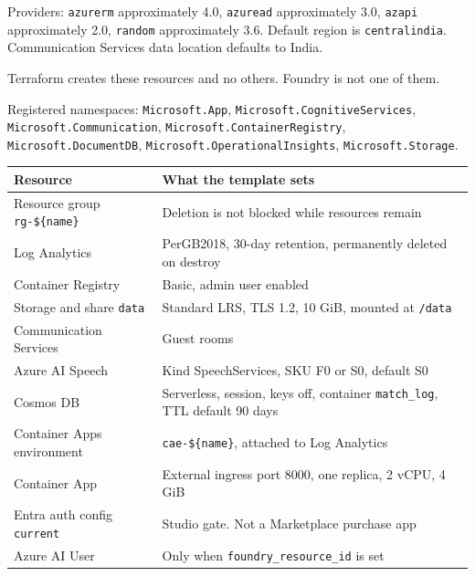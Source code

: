 \documentclass[11pt]{article}
\begin{document}
Providers: \texttt{azurerm} approximately 4.0, \texttt{azuread} approximately 3.0,
\texttt{azapi} approximately 2.0, \texttt{random} approximately 3.6.
Default region is \texttt{centralindia}.
Communication Services data location defaults to India.

\begin{center}
\end{center}
{\small\color{Muted} Terraform creates these resources and no others. Foundry is not one of them.\par}
Registered namespaces: \texttt{Microsoft.App}, \texttt{Microsoft.CognitiveServices},
\texttt{Microsoft.Communication}, \texttt{Microsoft.ContainerRegistry},
\texttt{Microsoft.DocumentDB}, \texttt{Microsoft.OperationalInsights},
\texttt{Microsoft.Storage}.

\begin{tabularx}{\textwidth}{@{}lX@{}}
\toprule
Resource & What the template sets \\
\midrule
Resource group \texttt{rg-\$\{name\}} & Deletion is not blocked while resources remain \\
Log Analytics & PerGB2018, 30-day retention, permanently deleted on destroy \\
Container Registry & Basic, admin user enabled \\
Storage and share \texttt{data} & Standard LRS, TLS 1.2, 10 GiB, mounted at \texttt{/data} \\
Communication Services & Guest rooms \\
Azure AI Speech & Kind SpeechServices, SKU F0 or S0, default S0 \\
Cosmos DB & Serverless, session, keys off, container \texttt{match\_log}, TTL default 90 days \\
Container Apps environment & \texttt{cae-\$\{name\}}, attached to Log Analytics \\
Container App & External ingress port 8000, one replica, 2 vCPU, 4 GiB \\
Entra auth config \texttt{current} & Studio gate. Not a Marketplace purchase app \\
Azure AI User & Only when \texttt{foundry\_resource\_id} is set \\
\bottomrule
\end{tabularx}
\end{document}
